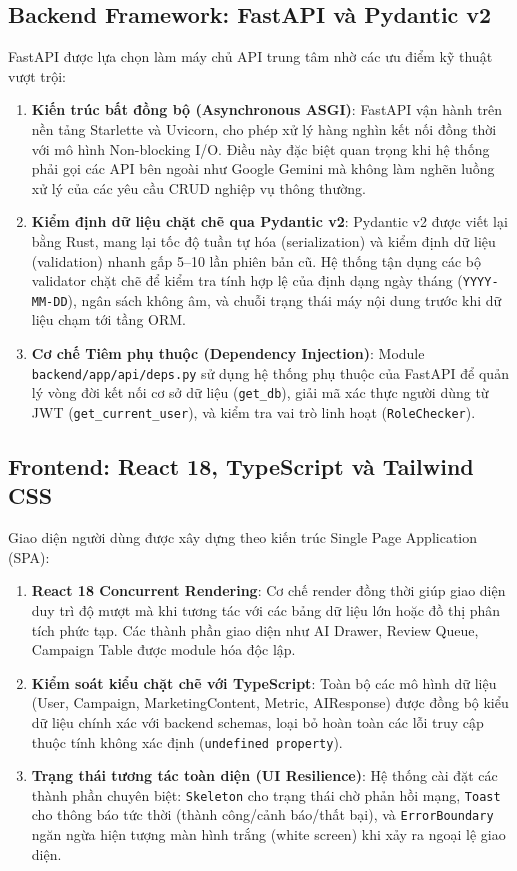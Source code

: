 \subsection{Backend Framework: FastAPI và Pydantic v2}
FastAPI được lựa chọn làm máy chủ API trung tâm nhờ các ưu điểm kỹ thuật vượt trội:
\begin{enumerate}
  \item \textbf{Kiến trúc bất đồng bộ (Asynchronous ASGI)}: FastAPI vận hành trên nền tảng Starlette và Uvicorn, cho phép xử lý hàng nghìn kết nối đồng thời với mô hình Non-blocking I/O. Điều này đặc biệt quan trọng khi hệ thống phải gọi các API bên ngoài như Google Gemini mà không làm nghẽn luồng xử lý của các yêu cầu CRUD nghiệp vụ thông thường.
  \item \textbf{Kiểm định dữ liệu chặt chẽ qua Pydantic v2}: Pydantic v2 được viết lại bằng Rust, mang lại tốc độ tuần tự hóa (serialization) và kiểm định dữ liệu (validation) nhanh gấp 5--10 lần phiên bản cũ. Hệ thống tận dụng các bộ validator chặt chẽ để kiểm tra tính hợp lệ của định dạng ngày tháng (\texttt{YYYY-MM-DD}), ngân sách không âm, và chuỗi trạng thái máy nội dung trước khi dữ liệu chạm tới tầng ORM.
  \item \textbf{Cơ chế Tiêm phụ thuộc (Dependency Injection)}: Module \texttt{backend/\allowbreak app/\allowbreak api/\allowbreak deps.py} sử dụng hệ thống phụ thuộc của FastAPI để quản lý vòng đời kết nối cơ sở dữ liệu (\texttt{get\_db}), giải mã xác thực người dùng từ JWT (\texttt{get\_current\_user}), và kiểm tra vai trò linh hoạt (\texttt{RoleChecker}).
\end{enumerate}

\subsection{Frontend: React 18, TypeScript và Tailwind CSS}
Giao diện người dùng được xây dựng theo kiến trúc Single Page Application (SPA):
\begin{enumerate}
  \item \textbf{React 18 Concurrent Rendering}: Cơ chế render đồng thời giúp giao diện duy trì độ mượt mà khi tương tác với các bảng dữ liệu lớn hoặc đồ thị phân tích phức tạp. Các thành phần giao diện như AI Drawer, Review Queue, Campaign Table được module hóa độc lập.
  \item \textbf{Kiểm soát kiểu chặt chẽ với TypeScript}: Toàn bộ các mô hình dữ liệu (User, Campaign, MarketingContent, Metric, AIResponse) được đồng bộ kiểu dữ liệu chính xác với backend schemas, loại bỏ hoàn toàn các lỗi truy cập thuộc tính không xác định (\texttt{undefined property}).
  \item \textbf{Trạng thái tương tác toàn diện (UI Resilience)}: Hệ thống cài đặt các thành phần chuyên biệt: \texttt{Skeleton} cho trạng thái chờ phản hồi mạng, \texttt{Toast} cho thông báo tức thời (thành công/cảnh báo/thất bại), và \texttt{ErrorBoundary} ngăn ngừa hiện tượng màn hình trắng (white screen) khi xảy ra ngoại lệ giao diện.
\end{enumerate}

